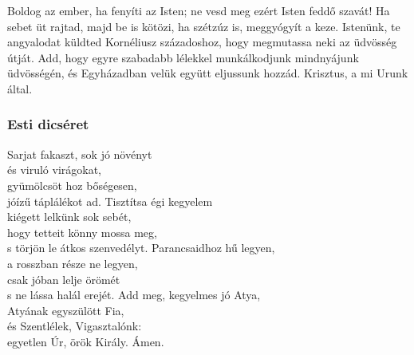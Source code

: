 \documentclass[twoside]{article}
\begin{document}
Boldog az ember, ha fenyíti az Isten; ne vesd meg ezért Isten feddő szavát! Ha sebet üt rajtad, majd be is kötözi, ha szétzúz is, meggyógyít a keze.
Istenünk, te angyalodat küldted Kornéliusz századoshoz, hogy megmutassa neki az üdvösség útját. Add, hogy egyre szabadabb lélekkel munkálkodjunk mindnyájunk üdvösségén, és Egyházadban velük együtt eljussunk hozzád. Krisztus, a mi Urunk által.

\subsubsection*{Esti dicséret}

\begin{hymnstanzas}
    Sarjat fakaszt, sok jó növényt\\
    és viruló virágokat,\\
    gyümölcsöt hoz bőségesen,\\
    jóízű táplálékot ad.
\stanzabreak
    Tisztítsa égi kegyelem\\
    kiégett lelkünk sok sebét,\\
    hogy tetteit könny mossa meg,\\
    s törjön le átkos szenvedélyt.
\stanzabreak
    Parancsaidhoz hű legyen,\\
    a rosszban része ne legyen,\\
    csak jóban lelje örömét\\
    s ne lássa halál erejét.
\stanzabreak
    Add meg, kegyelmes jó Atya,\\
    Atyának egyszülött Fia,\\
    és Szentlélek, Vigasztalónk:\\
    egyetlen Úr, örök Király. Ámen.
\end{hymnstanzas}
\end{document}
